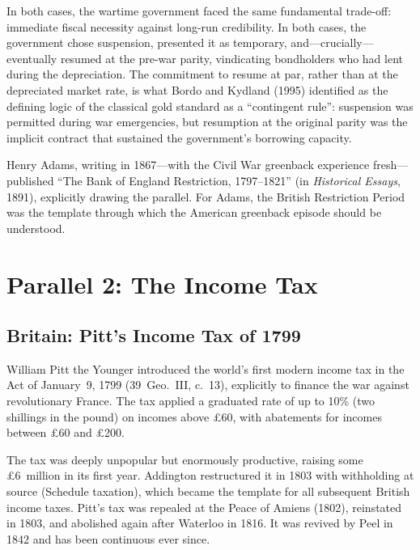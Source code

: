 \documentclass[12pt]{article}
\begin{document}
In both cases, the wartime government faced the same fundamental
trade-off: immediate fiscal necessity against long-run credibility. In
both cases, the government chose suspension, presented it as temporary,
and---crucially---eventually resumed at the pre-war parity, vindicating
bondholders who had lent during the depreciation. The commitment to
resume at par, rather than at the depreciated market rate, is what Bordo
and Kydland (1995) identified as the defining logic of the classical
gold standard as a ``contingent rule'': suspension was permitted during
war emergencies, but resumption at the original parity was the implicit
contract that sustained the government's borrowing capacity.

Henry Adams, writing in 1867---with the Civil War greenback experience
fresh---published ``The Bank of England Restriction, 1797--1821'' (in
\textit{Historical Essays}, 1891), explicitly drawing the parallel. For
Adams, the British Restriction Period was the template through which the
American greenback episode should be understood.

\section{Parallel 2: The Income Tax}
\label{sec:income-tax}

\subsection{Britain: Pitt's Income Tax of 1799}

William Pitt the Younger introduced the world's first modern income tax
in the Act of January~9, 1799 (39~Geo.~III, c.~13), explicitly to
finance the war against revolutionary France. The tax applied a
graduated rate of up to 10\% (two shillings in the pound) on incomes
above \pounds 60, with abatements for incomes between \pounds 60 and
\pounds 200.

The tax was deeply unpopular but enormously productive, raising some
\pounds 6~million in its first year. Addington restructured it in 1803
with withholding at source (Schedule taxation), which became the
template for all subsequent British income taxes. Pitt's tax was repealed
at the Peace of Amiens (1802), reinstated in 1803, and abolished again
after Waterloo in 1816. It was revived by Peel in 1842 and has been
continuous ever since.
\end{document}
